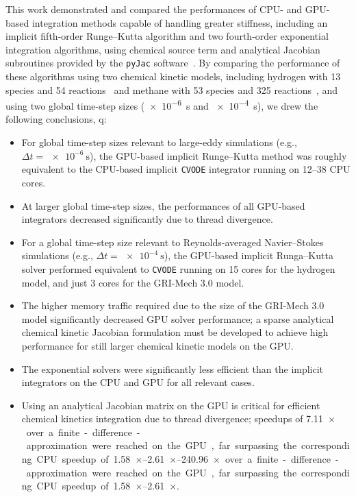 \documentclass[preprint,review,11pt]{elsarticle}
\begin{document}
This work demonstrated and compared the performances of CPU- and GPU-based integration methods capable of handling greater stiffness, including an implicit fifth-order Runge--Kutta algorithm and two fourth-order exponential integration algorithms, using chemical source term and analytical Jacobian subroutines provided by the \texttt{pyJac} software~\cite{niemeyer_2016_51139,Niemeyer:2015ws,Niemeyer:2016aa}.
By comparing the performance of these algorithms using two chemical kinetic models, including hydrogen with 13 species and 54 reactions~\cite{Burke:2011fh} and methane with 53 species and 325 reactions~\cite{smith_gri-mech_30}, and using two global time-step sizes (\SI{e-6}{\second} and \SI{e-4}{\second}), we drew the following conclusions, q:
\begin{itemize}
 \item For global time-step sizes relevant to large-eddy simulations (e.g., $\Delta t = \SI{e-6}{\s}$), the GPU-based implicit Runge--Kutta method was roughly equivalent to the CPU-based implicit \texttt{CVODE} integrator running on \numrange{12}{38} CPU cores.
 \item At larger global time-step sizes, the performances of all GPU-based integrators decreased significantly due to thread divergence.
 \item For a global time-step size relevant to Reynolds-averaged Navier--Stokes simulations (e.g., $\Delta t = \SI{e-4}{\s}$), the GPU-based implicit Runga--Kutta solver performed equivalent to \texttt{CVODE} running on \num{15} cores for the hydrogen model, and just \num{3} cores for the GRI-Mech 3.0 model.
 \item The higher memory traffic required due to the size of the GRI-Mech 3.0 model significantly decreased GPU solver performance; a sparse analytical chemical kinetic Jacobian formulation must be developed to achieve high performance for still larger chemical kinetic models on the GPU.
 \item The exponential solvers were significantly less efficient than the implicit integrators on the CPU and GPU for all relevant cases.
 \item Using an analytical Jacobian matrix on the GPU is critical for efficient chemical kinetics integration due to thread divergence; speedups of \SIrange{7.11}{240.96}{$\times$} over a finite-difference-approximation were reached on the GPU, far surpassing the corresponding CPU speedup of \SIrange{1.58}{2.61}{$\times$}.
\end{itemize}
\end{document}
